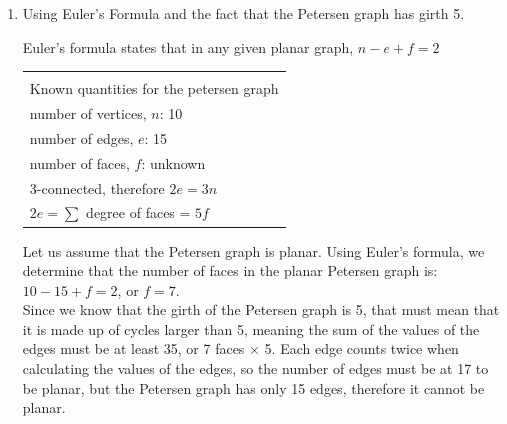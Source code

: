 \documentclass[12pt]{article}
\newenvironment{question}[2][Question]{\begin{trivlist}
\item[\hskip \labelsep {\bfseries #1}\hskip \labelsep {\bfseries #2.}]}{\end{trivlist}}
\begin{document}
\begin{question}{5}
\begin{enumerate}[label=\alph*)]
  \item Using Euler's Formula and the fact that the Petersen graph has girth 5.
   \begin{center}  
   \end{center}
  Euler's formula states that in any given planar graph, $n-e+f=2$ 
   \begin{center}  
     \begin{tabular}{|l|} \hline \\
  	Known quantities for the petersen graph \\ \hline
  	number of vertices, $n$: 10  \\ \hline
  	number of edges, $e$: 15  \\ \hline
  	number of faces, $f$: unknown \\ \hline
  	3-connected, therefore $2e = 3n$ \\ \hline
  	$2e = \sum $ degree of faces = $5f$ \\ \hline
      \end{tabular}
  \end{center}


Let us assume that the Petersen graph is planar.  Using Euler's formula, we determine that the number of faces in the planar Petersen graph is: \\
$10 - 15 + f = 2$, or $f =7$. \\
Since we know that the girth of the Petersen graph is 5, that must mean that it is made up of cycles larger than 5, meaning the sum of the values of the edges must be at least 35, or 7 faces $\times$ 5.  Each edge counts twice when calculating the values of the edges, so the number of edges must be at 17 to be planar, but the Petersen graph has only 15 edges, therefore it cannot be planar.

\end{enumerate}

\end{question}




\end{document}
